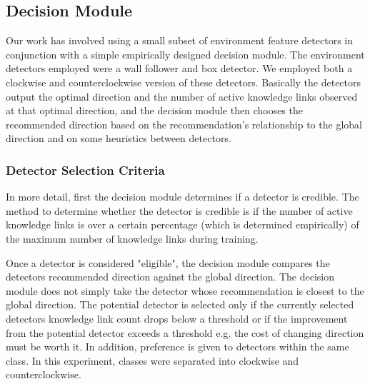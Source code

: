 \documentclass[journal]{IEEEtran}
\begin{document}
\subsection{Decision Module}
\label{sec:Decision Module}
Our work has involved using a small subset of environment feature detectors in conjunction with a simple empirically designed decision module.
The environment detectors employed were a wall follower and box detector.
We employed both a clockwise and counterclockwise version of these detectors.
Basically the detectors output the optimal direction and the number of active knowledge links observed at that optimal direction,
and the decision module then chooses the recommended direction based on the recommendation's relationship to the global direction
and on some heuristics between detectors.

\subsubsection{Detector Selection Criteria}
\label{sec:Detector Selection Criteria}
In more detail, first the decision module determines if a detector is credible.
The method to determine whether the detector is credible is
if the number of active knowledge links is over a certain percentage (which is determined empirically)
of the maximum number of knowledge links during training.

Once a detector is considered "eligible", the decision module compares the detectors recommended direction against the global direction.
The decision module does not simply take the detector whose recommendation is closest to the global direction.
The potential detector is selected only if the currently selected detectors knowledge link count drops below a threshold or if the improvement from
the potential detector exceeds a threshold e.g. the cost of changing direction must be worth it.
In addition, preference is given to detectors within the same class. In this experiment, classes were separated into clockwise and counterclockwise.
\end{document}
